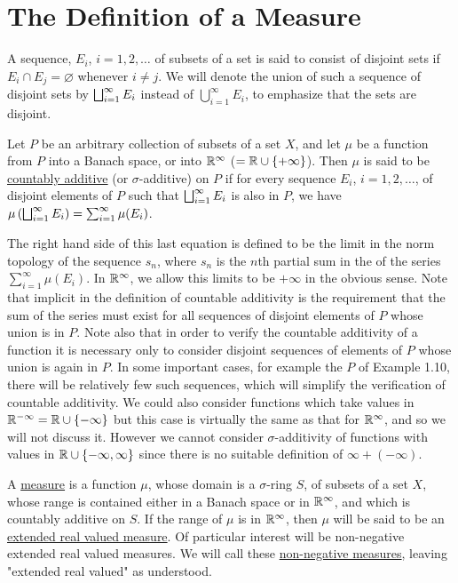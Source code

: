 \section{The Definition of a Measure}


A sequence, $E_i$, $i=1,2,\dots$ of subsets of a set is said to consist of disjoint sets if $E_i\cap E_j=\varnothing$ whenever $i\neq j$. We will denote the union of such a sequence of disjoint sets by $\bigsqcup_{i=1}^\infty E_i$ instead of $\bigcup_{i=1}^\infty E_i$, to emphasize that the sets are disjoint.

\begin{definition}
Let $P$ be an arbitrary collection of subsets of a set $X$, and let $\mu$ be a function from $P$ into a Banach space, or into $\mathbb{R}^\infty$ ($=\mathbb{R}\cup\left\{+\infty\right\}$). Then $\mu$ is said to be \underline{countably additive} (or $\sigma$-additive) on $P$ if for every sequence $E_i$, $i=1,2,\dots$, of disjoint elements of $P$ such that $\bigsqcup_{i=1}^\infty E_i$ is also in $P$, we have $\mu\left(\bigsqcup_{i=1}^\infty E_i\right)=\sum_{i=1}^\infty\mu(E_i)$. 
\end{definition}

The right hand side of this last equation is defined to be the limit in the norm topology of the sequence $s_n$, where $s_n$ is the $n$th partial sum in the of the series $\sum_{i=1}^\infty\mu(E_i)$. In $\mathbb{R}^\infty$, we allow this limits to be $+\infty$ in the obvious sense. Note that implicit in the definition of countable additivity is the requirement that the sum of the series must exist for all sequences of disjoint elements of $P$ whose union is in $P$. Note also that in order to verify the countable additivity of a function it is necessary only to consider disjoint sequences of elements of $P$ whose union is again in $P$. In some important cases, for example the $P$ of Example 1.10, there will be relatively few such sequences, which will simplify the verification of countable additivity. We could also consider functions which take values in $\mathbb{R}^{-\infty} = \mathbb{R}\cup\left\{-\infty\right\}$ but this case is virtually the same as that for $\mathbb{R}^\infty$, and so we will not discuss it. However we cannot consider $\sigma$-additivity of functions with values in $\mathbb{R}\cup\left\{-\infty,\infty\right\}$ since there is no suitable definition of $\infty+(-\infty)$. %

\begin{definition}
A \underline{measure} is a function $\mu$, whose domain is a $\sigma$-ring $S$, of subsets of a set $X$, whose range is contained either in a Banach space or in $\mathbb{R}^\infty$, and which is countably additive on $S$. If the range of $\mu$ is in $\mathbb{R}^\infty$, then $\mu$ will be said to be an \underline{extended real valued measure}. Of particular interest will be non-negative extended real valued measures. We will call these \underline{non-negative measures}, leaving "extended real valued" as understood.
\end{definition}


